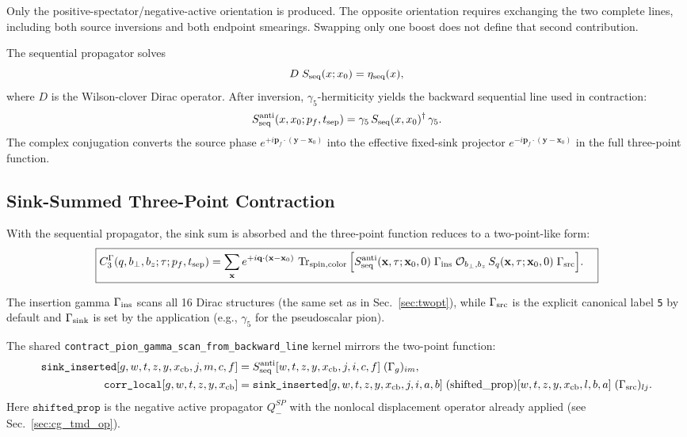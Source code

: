 \documentclass[11pt,a4paper]{article}
\begin{document}
Only the positive-spectator/negative-active orientation is produced.  The
opposite orientation requires exchanging the two complete lines, including
both source inversions and both endpoint smearings.  Swapping only one boost
does not define that second contribution.

The sequential propagator solves
\begin{equation}
  D\; S_{\rm seq}(x; x_0) = \eta_{\rm seq}(x),
\end{equation}
where $D$ is the Wilson-clover Dirac operator.  After inversion,
$\gamma_5$-hermiticity yields the backward sequential line used in contraction:
\begin{equation}
  S_{\rm seq}^{\rm anti}(x,x_0; p_f, t_{\rm sep})
  =
  \gamma_5\,
  S_{\rm seq}(x,x_0)^\dagger\,
  \gamma_5.
  \label{eq:seq_anti}
\end{equation}
The complex conjugation converts the source phase
$e^{+i\mathbf p_f\cdot(\mathbf y-\mathbf x_0)}$ into the effective fixed-sink
projector $e^{-i\mathbf p_f\cdot(\mathbf y-\mathbf x_0)}$ in the full
three-point function.

\subsection{Sink-Summed Three-Point Contraction}

With the sequential propagator, the sink sum is absorbed and the three-point
function reduces to a two-point-like form:
\begin{equation}
  \boxed{
  \begin{aligned}
    C_3^{\Gamma}(q, b_\perp, b_z; \tau; p_f, t_{\rm sep})
    &=
    \sum_{\mathbf{x}}
    e^{+i\mathbf{q}\cdot(\mathbf{x}-\mathbf{x}_0)}
    \,
    \Tr_{\rm spin, color}\Big[
      S_{\rm seq}^{\rm anti}(\mathbf{x},\tau; \mathbf{x}_0,0)
      \;
      \Gamma_{\rm ins}
      \;
      \mathcal{O}_{b_\perp,b_z}\,
      S_q(\mathbf{x},\tau; \mathbf{x}_0,0)
      \;
      \Gamma_{\rm src}
    \Big].
  \end{aligned}}
  \label{eq:c3_seq}
\end{equation}

The insertion gamma $\Gamma_{\rm ins}$ scans all 16 Dirac structures (the same
set as in Sec.~\ref{sec:twopt}), while $\Gamma_{\rm src}$ is the explicit
canonical label \texttt{5} by default and $\Gamma_{\rm sink}$ is set by the application (e.g.,
$\gamma_5$ for the pseudoscalar pion).

The shared \verb|contract_pion_gamma_scan_from_backward_line| kernel mirrors the
two-point function:
\begin{align}
  \texttt{sink\_inserted}[g,w,t,z,y,x_{\rm cb},j,m,c,f]
  &=
  S_{\rm seq}^{\rm anti}[w,t,z,y,x_{\rm cb},j,i,c,f]\;
  (\Gamma_g)_{i m},
  \\
  \texttt{corr\_local}[g,w,t,z,y,x_{\rm cb}]
  &=
  \texttt{sink\_inserted}[g,w,t,z,y,x_{\rm cb},j,i,a,b]\;
  (\text{shifted\_prop})[w,t,z,y,x_{\rm cb},l,b,a]\;
  (\Gamma_{\rm src})_{l j}.
\end{align}
Here $\texttt{shifted\_prop}$ is the negative active propagator $Q_-^{SP}$
with the nonlocal displacement operator already applied (see
Sec.~\ref{sec:cg_tmd_op}).
\end{document}
